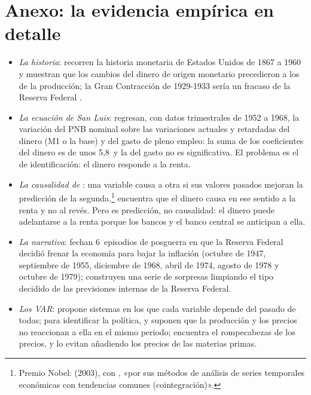 \documentclass[11pt]{article}
\begin{document}
\section{Anexo: la evidencia empírica en detalle}\label{anexo:evidencia}

\begin{itemize}
\item \emph{La historia}: \textcite{FriedmanSchwartz1963Monetary} recorren la historia monetaria de Estados Unidos de 1867 a 1960 y muestran que los cambios del dinero de origen monetario precedieron a los de la producción; la Gran Contracción de 1929-1933 sería un fracaso de la Reserva Federal .
\item \emph{La ecuación de San Luis}: \textcite{AndersenJordan1968Monetary} regresan, con datos trimestrales de 1952 a 1968, la variación del PNB nominal sobre las variaciones actuales y retardadas del dinero (M1 o la base) y del gasto de pleno empleo: la suma de los coeficientes del dinero es de unos 5,8~y la del gasto no es significativa. El problema es el de identificación: el dinero responde a la renta.
\item \emph{La causalidad de }: una variable causa a otra si sus valores pasados mejoran la predicción de la segunda\nocite{Granger1969Investigating}.\footnote{Premio Nobel:  (2003), con , «por sus métodos de análisis de series temporales económicas con tendencias comunes (cointegración)»\nocite{Nobel2003EngleGranger}.} \textcite{Sims1972Money} encuentra que el dinero causa en ese sentido a la renta y no al revés. Pero es predicción, no causalidad: el dinero puede adelantarse a la renta porque los bancos y el banco central se anticipan a ella.
\item \emph{La narrativa}: \textcite{RomerRomer1989Does} fechan 6~episodios de posguerra en que la Reserva Federal decidió frenar la economía para bajar la inflación (octubre de 1947, septiembre de 1955, diciembre de 1968, abril de 1974, agosto de 1978 y octubre de 1979); \textcite{RomerRomer2004New} construyen una serie de sorpresas limpiando el tipo decidido de las previsiones internas de la Reserva Federal.
\item \emph{Los VAR}: \textcite{Sims1980Macroeconomics} propone sistemas en los que cada variable depende del pasado de todas; para identificar la política, \textcite{Sims1992Interpreting} y \textcite{ChristianoEichenbaumEvans1996Effects} suponen que la producción y los precios no reaccionan a ella en el mismo periodo; \textcite{Sims1992Interpreting} encuentra el rompecabezas de los precios, y \textcite{ChristianoEichenbaumEvans1996Effects} lo evitan añadiendo los precios de las materias primas.

\end{itemize}
\end{document}
